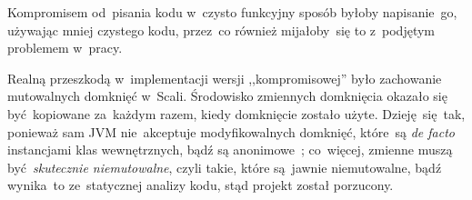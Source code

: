 \documentclass[../../praca.tex]{subfiles}
\begin{document}
Kompromisem od~pisania kodu w~czysto funkcyjny sposób byłoby napisanie~go, używając
mniej czystego kodu, przez~co również mijałoby~się to z~podjętym problemem w~pracy.

Realną przeszkodą w~implementacji wersji ,,kompromisowej'' było zachowanie mutowalnych
domknięć w~Scali. Środowisko zmiennych domknięcia okazało się być~kopiowane za~każdym razem, kiedy
domknięcie zostało użyte. Dzieję~się~tak, ponieważ sam JVM nie~akceptuje modyfikowalnych
domknięć, które~są \emph{de facto} instancjami klas wewnętrznych, bądź są anonimowe~\cite{Oracle:IC}; co~więcej, 
zmienne muszą być~\emph{skutecznie niemutowalne}, czyli takie, które są~jawnie 
niemutowalne, bądź wynika~to ze~statycznej analizy kodu, stąd projekt został porzucony.
\end{document}
